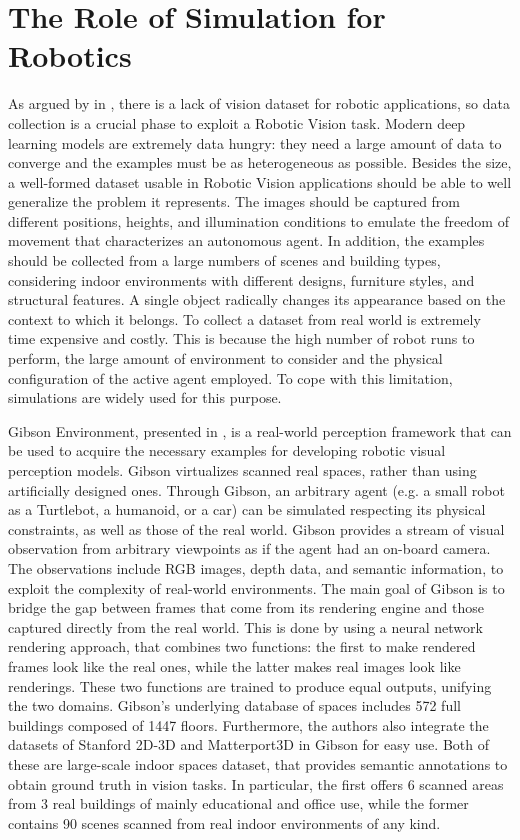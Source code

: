 
 \section{The Role of Simulation for Robotics}
 \label{sec:importanceofsimulation}
 As argued by \citeauthor{surveydeeplimits} in \cite{surveydeeplimits}, there is a lack of vision dataset for robotic applications, so data collection is a crucial phase to exploit a Robotic Vision task. Modern deep learning models are extremely data hungry: they need a large amount of data to converge and the examples must be as heterogeneous as possible. Besides the size, a well-formed dataset usable in Robotic Vision applications should be able to well generalize the problem it represents. The images should be captured from different positions, heights, and illumination conditions to emulate the freedom of movement that characterizes an autonomous agent. In addition, the examples should be collected from a large numbers of scenes and building types, considering indoor environments with different designs, furniture styles, and structural features. A single object radically changes its appearance based on the context to which it belongs. To collect a dataset from real world is extremely time expensive and costly. This is because the high number of robot runs to perform, the large amount of environment to consider and the physical configuration of the active agent employed. To cope with this limitation, simulations are widely used for this purpose. 
 
 Gibson Environment, presented in \cite{gibson}, is a real-world perception framework that can be used to acquire the necessary examples for developing robotic visual perception models. Gibson virtualizes scanned real spaces, rather than using artificially designed ones. Through Gibson, an arbitrary agent (e.g. a small robot as a Turtlebot, a humanoid, or a car) can be simulated respecting its physical constraints, as well as those of the real world. Gibson provides a stream of visual observation from arbitrary viewpoints as if the agent had an on-board camera. The observations include RGB images, depth data, and semantic information, to exploit the complexity of real-world environments. The main goal of Gibson is to bridge the gap between frames that come from its rendering engine and those captured directly from the real world. This is done by using a neural network rendering approach, that combines two functions: the first to make rendered frames look like the real ones, while the latter makes real images look like renderings. These two functions are trained to produce equal outputs, unifying the two domains. Gibson’s underlying database of spaces includes 572 full buildings composed of 1447 floors. Furthermore, the authors also integrate the datasets of Stanford 2D-3D \cite{stanford2d3d} and Matterport3D \cite{matterport} in Gibson for easy use. Both of these are large-scale indoor spaces dataset, that provides semantic annotations to obtain ground truth in vision tasks. In particular, the first offers 6 scanned areas from 3 real buildings of mainly educational and office use, while the former contains 90 scenes scanned from real indoor environments of any kind.
 

